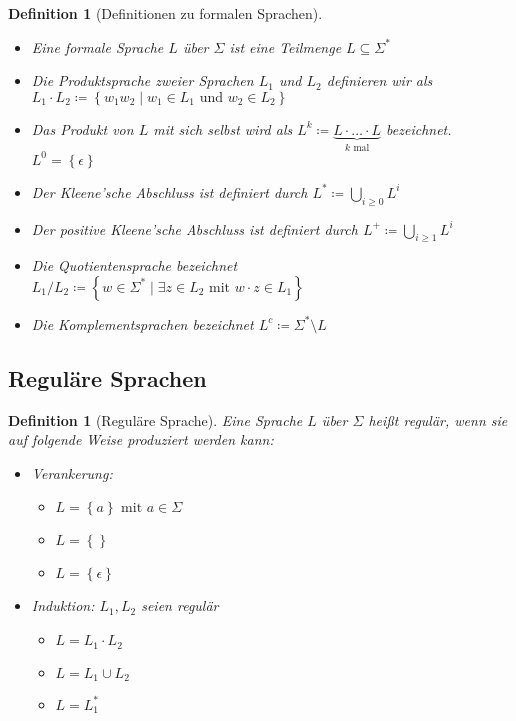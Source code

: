 \documentclass[11pt]{scrartcl}
\newcommand{\set}[1]{\left\lbrace #1\right\rbrace}
\theoremstyle{break}
\newtheorem{defi}[satz]{Definition}
\begin{document}
    \begin{defi}[Definitionen zu formalen Sprachen]
        \begin{itemize}
            \item Eine formale Sprache $L$ über $\Sigma$ ist eine Teilmenge $L\subseteq\Sigma^*$
            \item Die Produktsprache zweier Sprachen $L_1$ und $L_2$ definieren wir als\\ $L_1\cdot L_2\coloneqq\set{w_{1}w_{2}\mid w_{1}\in L_{1}\text{ und } w_{2}\in L_2}$
            \item Das Produkt von $L$ mit sich selbst wird als $L^k\coloneqq \underbrace{L\cdot\dots\cdot L}_{k\text{ mal}}$ bezeichnet. $L^0 = \set{\epsilon}$
            \item Der Kleene'sche Abschluss ist definiert durch $L^*\coloneqq \bigcup\limits_{i\geq 0} L^i$
            \item Der positive Kleene'sche Abschluss ist definiert durch $L^+\coloneqq \bigcup\limits_{i\geq 1} L^i$
            \item Die Quotientensprache bezeichnet $L_1/L_2\coloneqq\set{w\in \Sigma^*\mid\exists z\in L_2\text{ mit } w\cdot z\in L_1}$
            \item Die Komplementsprachen bezeichnet $L^c\coloneqq\Sigma^*\setminus L$
        \end{itemize}
    \end{defi}


    \subsection{Reguläre Sprachen}
	\label{subsec:reguläre-sprachenindex}

    \begin{defi}[Reguläre Sprache]
        Eine Sprache $L$ über $\Sigma$ heißt regulär, wenn sie auf folgende Weise produziert werden kann:
        \begin{itemize}
            \item Verankerung:
            \begin{itemize}
                \item $L=\set{a}\text{ mit } a\in\Sigma$
                \item $L=\set{}$
                \item $L=\set{\epsilon}$
            \end{itemize}
            \item Induktion: $L_1,L_2$ seien regulär
            \begin{itemize}
                \item $L=L_1\cdot L_2$
                \item $L=L_1\cup L_2$
                \item $L=L_1^*$
            \end{itemize}
        \end{itemize}
    \end{defi}
\end{document}
